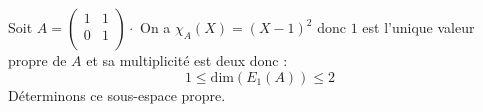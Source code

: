 \documentclass[french,11pt,twoside]{VcCours}
\begin{document}
\begin{Exemple}{} Soit $A = \begin{pmatrix}
1 & 1 \\
0 & 1 \\
\end{pmatrix} \cdot$
On a $\chi_A(X) = (X-1)^2$ donc $1$ est l'unique valeur propre  de $A$ et sa multiplicité est deux donc :
$$ 1 \leq \textrm{dim}(E_1(A)) \leq 2$$
Déterminons ce sous-espace propre. 

%
%

\end{Exemple}
\end{document}
